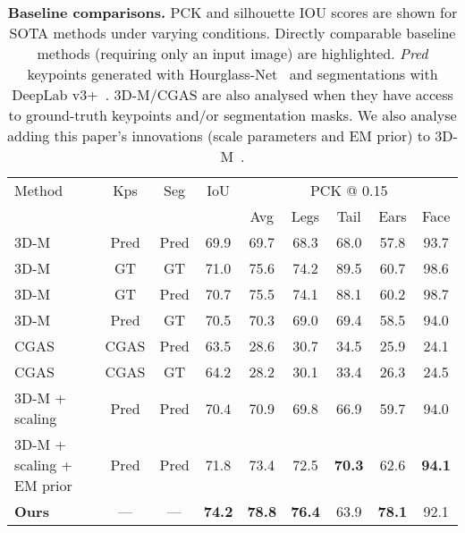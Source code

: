 \begin{table}[]
{
    \small
    \centering
    \begin{tabular}{@{}lcccccccc@{}}
    \toprule
    \multicolumn{1}{l}{Method} & 
    \multicolumn{1}{c}{Kps} & 
    \multicolumn{1}{c}{Seg} & 
    \multicolumn{1}{c}{IoU} & 
    \multicolumn{5}{c}{PCK @ 0.15} \\
    \multicolumn{4}{c}{} &
    \multicolumn{1}{c}{Avg} &
    \multicolumn{1}{c}{Legs} &
    \multicolumn{1}{c}{Tail} &
    \multicolumn{1}{c}{Ears} &
    \multicolumn{1}{c}{Face} \\
    \midrule
    \rowcolor{comp} 3D-M~\cite{zuffi2017menagerie} & Pred & Pred & 69.9 & 69.7 & 68.3 & 68.0 & 57.8 & 93.7 \\
    \rowcolor{notcomp} 3D-M & GT & GT & 71.0 & 75.6 & 74.2 & 89.5 & 60.7 & 98.6 \\
    \rowcolor{notcomp} 3D-M & GT & Pred & 70.7 & 75.5 & 74.1 & 88.1 & 60.2 & 98.7 \\
    \rowcolor{notcomp} 3D-M & Pred & GT & 70.5 & 70.3 & 69.0 & 69.4 & 58.5 & 94.0 \\
    \hline
    \rowcolor{comp} CGAS~\cite{biggs2018creatures} & CGAS & Pred & 63.5 & 28.6 & 30.7 & 34.5 & 25.9 & 24.1 \\
    \rowcolor{notcomp} CGAS & CGAS & GT & 64.2 & 28.2 & 30.1 & 33.4 & 26.3 & 24.5 \\
    \hline
    \rowcolor{comp} 3D-M + scaling & Pred & Pred & 70.4 & 70.9 & 69.8 & 66.9 & 59.7 & 94.0 \\
    \rowcolor{comp} 3D-M + scaling + EM prior & Pred & Pred & 71.8 & 73.4 & 72.5 & \textbf{70.3} & 62.6 & \textbf{94.1} \\
    \hline
    \rowcolor{comp} \textbf{Ours} & --- & --- & \textbf{74.2} & \textbf{78.8} & \textbf{76.4} & 63.9 & \textbf{78.1} & 92.1 \\
    \bottomrule 
    \end{tabular}
    \caption[]{\label{tab:baselinesfix}\textbf{Baseline comparisons.} PCK and silhouette IOU scores are shown for SOTA methods under varying conditions. Directly comparable baseline methods (requiring only an input image) are highlighted. \emph{Pred} keypoints generated with Hourglass-Net~\cite{newell2016stacked} and segmentations with DeepLab v3+~\cite{deeplabv3plus}. 3D-M/CGAS are also analysed when they have access to ground-truth keypoints and/or segmentation masks. We also analyse adding this paper's innovations (scale parameters and EM prior) to 3D-M~\cite{zuffi2017menagerie}.}
}
\end{table}